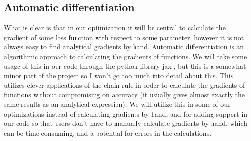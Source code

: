 \documentclass{article}
\begin{document}
\subsection{Automatic differentiation}
What is clear is that in our optimization it will be central to calculate the
gradient of some loss function with respect to some parameter, however it is not
always easy to find analytical gradients by hand. Automatic differentiation is
an algorithmic approach to calculating the gradients of functions. We will take
some usage of this in our code through the python-library jax
\cite{githubrepojax}, but this is a somewhat minor part of the project so I
won't go too much into detail about this. This utilizes clever applications of
the chain rule in order to calculate the gradients of functions without
compromising on accuracy (it usually gives almost exactly the same results as an
analytical expression).  We will utilize this in some of our optimizations
instead of calculating gradients by hand, and for adding support in our code so
that users don't have to manually calculate gradients by hand, which can be
time-consuming, and a potential for errors in the calculations.
\end{document}
